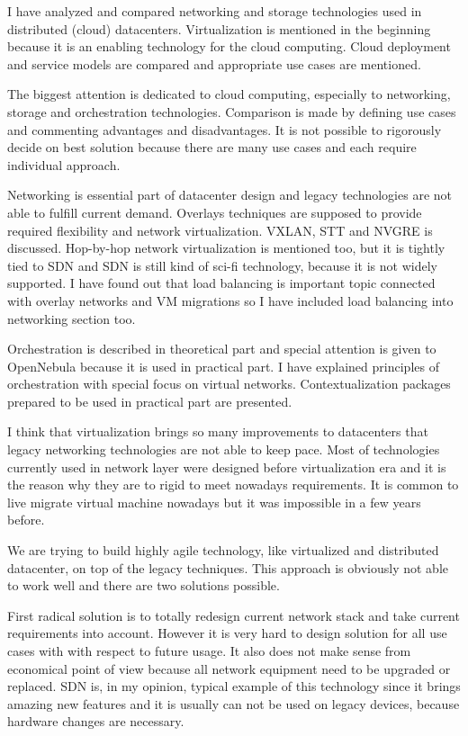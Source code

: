 
I have analyzed and compared networking and storage technologies used in distributed (cloud) datacenters. Virtualization is mentioned in the beginning because it is an enabling technology for the cloud computing. Cloud deployment and service models are compared and appropriate use cases are mentioned.

The biggest attention is dedicated to cloud computing, especially to networking, storage and orchestration technologies. Comparison is made by defining use cases and commenting advantages and disadvantages. It is not possible to rigorously decide on best solution because there are many use cases and each require individual approach.

Networking is essential part of datacenter design and legacy technologies are not able to fulfill current demand. Overlays techniques are supposed to provide required flexibility and network virtualization. \Ac{VXLAN}, \Ac{STT} and \Ac{NVGRE} is discussed. Hop-by-hop network virtualization is mentioned too, but it is tightly tied to \Ac{SDN} and \Ac{SDN} is still kind of sci-fi technology, because it is not widely supported.  
I have found out that load balancing is important topic connected with overlay networks and \Ac{VM} migrations so I have included load balancing into networking section too.


Orchestration is described in theoretical part and special attention is given to OpenNebula because it is used in practical part. I have explained principles of orchestration with special focus on virtual networks. Contextualization packages prepared to be used in practical part are presented.

I think that virtualization brings so many improvements to datacenters that legacy networking technologies are not able to keep pace. Most of technologies currently used in network layer were designed before virtualization era and it is the reason why they are to rigid to meet nowadays requirements. It is common to live migrate virtual machine nowadays but it was impossible in a few years before.

We are trying to build highly agile technology, like virtualized and distributed datacenter, on top of the legacy techniques. This approach is obviously not able to work well and there are two solutions possible. 

First radical solution is to totally redesign current network stack and take current requirements into account. However it is very hard to design solution for all use cases with with respect to future usage. It also does not make sense from economical point of view because all network equipment need to be upgraded or replaced. \Ac{SDN} is, in my opinion, typical example of this technology since it brings amazing new features and it is usually can not be used on legacy devices, because hardware changes are necessary.

